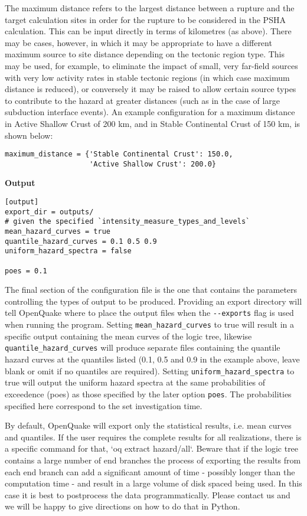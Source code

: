 The maximum distance refers to the largest distance between a rupture and the target calculation sites in order for the rupture to be considered in the PSHA calculation. This can be input directly in terms of kilometres (as above). There may be cases, however, in which it may be appropriate to have a different maximum source to site distance depending on the tectonic region type. This may be used, for example, to eliminate the impact of small, very far-field sources with very low activity rates in stable tectonic regions (in which case maximum distance is reduced), or conversely it may be raised to allow certain source types to contribute to the hazard at greater distances (such as in the case of large subduction interface events). An example configuration for a maximum distance in Active Shallow Crust of 200 km, and in Stable Continental Crust of 150 km, is shown below:
\begin{verbatim}
maximum_distance = {'Stable Continental Crust': 150.0,
                    'Active Shallow Crust': 200.0}
\end{verbatim}


\textbf{Output}

\begin{verbatim}
[output]
export_dir = outputs/
# given the specified `intensity_measure_types_and_levels`
mean_hazard_curves = true
quantile_hazard_curves = 0.1 0.5 0.9
uniform_hazard_spectra = false

poes = 0.1
\end{verbatim}

The final section of the configuration file is the one that contains the
parameters controlling the types of output to be produced. Providing an export directory will tell OpenQuake where to place the output files when the \texttt{-{}-exports} flag is used when running the program. Setting \verb=mean_hazard_curves= to true will result in a specific output containing the mean curves of the logic tree, likewise \verb=quantile_hazard_curves= will produce separate files containing the quantile hazard curves at the quantiles listed (0.1, 0.5 and 0.9 in the example above, leave blank or omit if no quantiles are required). Setting \verb=uniform_hazard_spectra= to true will output the uniform hazard spectra at the same probabilities of exceedence (poes) as those specified by the later option \verb=poes=. The probabilities specified here correspond to the set investigation time. 

By default, OpenQuake will export only the statistical results, i.e. mean curves and quantiles.
If the user requires the complete results for all realizations, there is a specific command for
that, `oq extract hazard/all`. Beware that if the logic tree contains a large number of end
branches the process of exporting the results from each end branch can add a significant
amount of time - possibly longer than the computation time - and result in a large volume of
disk spaced being used. In this case it is best to postprocess the data programmatically.
Please contact us and we will be happy to give directions on how to do that in Python.
